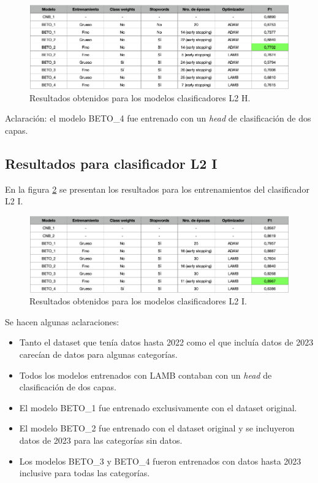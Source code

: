 \begin{figure}[htbp]
	\centering
	\includegraphics[width=1\textwidth]{./Figures/cap4-resultados-l2h.png}
	\caption{Resultados obtenidos para los modelos clasificadores L2 H.}
	\label{fig:res-l2h}
\end{figure}

Aclaración: el modelo BETO\_4 fue entrenado con un \textit{head} de clasificación de dos capas.

\subsection{Resultados para clasificador L2 I}

En la figura \ref{fig:res-l2i} se presentan los resultados para los entrenamientos del clasificador L2 I.

\begin{figure}[htbp]
	\centering
	\includegraphics[width=1\textwidth]{./Figures/cap4-resultados-l2i.png}
	\caption{Resultados obtenidos para los modelos clasificadores L2 I.}
	\label{fig:res-l2i}
\end{figure}

Se hacen algunas aclaraciones:
\begin{itemize}
	\item Tanto el dataset que tenía datos hasta 2022 como el que incluía datos de 2023 carecían de datos para algunas categorías.
	\item Todos los modelos entrenados con LAMB contaban con un \textit{head} de clasificación de dos capas.
	\item El modelo BETO\_1 fue entrenado exclusivamente con el dataset original.
	\item El modelo BETO\_2 fue entrenado con el dataset original y se incluyeron datos de 2023 para las categorías sin datos.
	\item Los modelos BETO\_3 y BETO\_4 fueron entrenados con datos hasta 2023 inclusive para todas las categorías.
\end{itemize}

